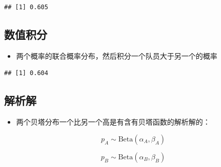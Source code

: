 \documentclass[]{book}
\newenvironment{Shaded}{\begin{snugshade}}{\end{snugshade}}
\newcommand{\ControlFlowTok}[1]{\textcolor[rgb]{0.13,0.29,0.53}{\textbf{#1}}}
\newcommand{\DecValTok}[1]{\textcolor[rgb]{0.00,0.00,0.81}{#1}}
\newcommand{\FloatTok}[1]{\textcolor[rgb]{0.00,0.00,0.81}{#1}}
\newcommand{\KeywordTok}[1]{\textcolor[rgb]{0.13,0.29,0.53}{\textbf{#1}}}
\newcommand{\NormalTok}[1]{#1}
\newcommand{\OperatorTok}[1]{\textcolor[rgb]{0.81,0.36,0.00}{\textbf{#1}}}
\newcommand{\StringTok}[1]{\textcolor[rgb]{0.31,0.60,0.02}{#1}}
\providecommand{\tightlist}{%
  \setlength{\itemsep}{0pt}\setlength{\parskip}{0pt}}
\begin{document}
\begin{verbatim}
## [1] 0.605
\end{verbatim}

\hypertarget{ux6570ux503cux79efux5206}{%
\subsection{数值积分}\label{ux6570ux503cux79efux5206}}

\begin{itemize}
\tightlist
\item
  两个概率的联合概率分布，然后积分一个队员大于另一个的概率
\end{itemize}

\begin{Shaded}
\end{Shaded}

\begin{verbatim}
## [1] 0.604
\end{verbatim}

\hypertarget{ux89e3ux6790ux89e3}{%
\subsection{解析解}\label{ux89e3ux6790ux89e3}}

\begin{itemize}
\tightlist
\item
  两个贝塔分布一个比另一个高是有含有贝塔函数的解析解的：
\end{itemize}

\[p_A \sim \mbox{Beta}(\alpha_A, \beta_A)\]

\[p_B \sim \mbox{Beta}(\alpha_B, \beta_B)\]
\end{document}

